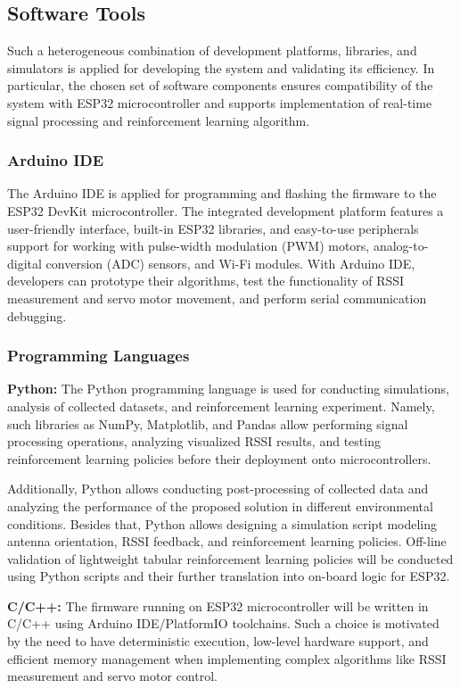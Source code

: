 \subsection{Software Tools}

Such a heterogeneous combination of development platforms, libraries, and simulators is applied for developing the system and validating its efficiency. In particular, the chosen set of software components ensures compatibility of the system with ESP32 microcontroller and supports implementation of real-time signal processing and reinforcement learning algorithm.

\subsubsection{Arduino IDE}
The Arduino IDE is applied for programming and flashing the firmware to the ESP32 DevKit microcontroller. The integrated development platform features a user-friendly interface, built-in ESP32 libraries, and easy-to-use peripherals support for working with pulse-width modulation (PWM) motors, analog-to-digital conversion (ADC) sensors, and Wi-Fi modules. With Arduino IDE, developers can prototype their algorithms, test the functionality of RSSI measurement and servo motor movement, and perform serial communication debugging.

\subsubsection{Programming Languages}

\textbf{Python:} The Python programming language is used for conducting simulations, analysis of collected datasets, and reinforcement learning experiment. Namely, such libraries as NumPy, Matplotlib, and Pandas allow performing signal processing operations, analyzing visualized RSSI results, and testing reinforcement learning policies before their deployment onto microcontrollers. 

Additionally, Python allows conducting post-processing of collected data and analyzing the performance of the proposed solution in different environmental conditions. Besides that, Python allows designing a simulation script modeling antenna orientation, RSSI feedback, and reinforcement learning policies. Off-line validation of lightweight tabular reinforcement learning policies will be conducted using Python scripts and their further translation into on-board logic for ESP32.

\textbf{C/C++:} The firmware running on ESP32 microcontroller will be written in C/C++ using Arduino IDE/PlatformIO toolchains. Such a choice is motivated by the need to have deterministic execution, low-level hardware support, and efficient memory management when implementing complex algorithms like RSSI measurement and servo motor control.

